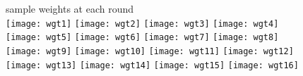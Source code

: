 \documentclass[fleqn,aspectratio=1610]{beamer}
\begin{document}
\begin{frame}[label={sec:orge066d8c}]{}
\begin{center}
sample weights at each round\\
\texttt{[image: wgt1]}
\hspace*{5pt}
\texttt{[image: wgt2]}
\hspace*{5pt}
\texttt{[image: wgt3]}
\hspace*{5pt}
\texttt{[image: wgt4]}
\\
\texttt{[image: wgt5]}
\hspace*{5pt}
\texttt{[image: wgt6]}
\hspace*{5pt}
\texttt{[image: wgt7]}
\hspace*{5pt}
\texttt{[image: wgt8]}
\\
\texttt{[image: wgt9]}
\hspace*{5pt}
\texttt{[image: wgt10]}
\hspace*{5pt}
\texttt{[image: wgt11]}
\hspace*{5pt}
\texttt{[image: wgt12]}
\\
\texttt{[image: wgt13]}
\hspace*{5pt}
\texttt{[image: wgt14]}
\hspace*{5pt}
\texttt{[image: wgt15]}
\hspace*{5pt}
\texttt{[image: wgt16]}
\end{center}
\end{frame}
\end{document}
